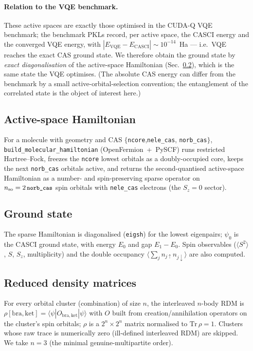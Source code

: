 \documentclass[11pt]{article}
\newcommand{\code}[1]{\texttt{\small #1}}
\begin{document}
\paragraph{Relation to the VQE benchmark.}
These active spaces are exactly those optimised in the CUDA-Q VQE benchmark; the
benchmark PKLs record, per active space, the CASCI energy and the converged VQE
energy, with $|E_{\mathrm{VQE}}-E_{\mathrm{CASCI}}|\sim10^{-14}$~Ha --- i.e.\ VQE
reaches the exact CAS ground state. We therefore obtain the ground state by
\emph{exact diagonalisation} of the active-space Hamiltonian (Sec.~\ref{sec:gs}),
which is the same state the VQE optimises. (The absolute CAS energy can differ
from the benchmark by a small active-orbital-selection convention; the
entanglement of the correlated state is the object of interest here.)

\subsection{Active-space Hamiltonian}
For a molecule with geometry and CAS $\{$\code{ncore},\code{nele\_cas},
\code{norb\_cas}$\}$, \code{build\_molecular\_hamiltonian} (OpenFermion~+~PySCF)
runs restricted Hartree--Fock, freezes the \code{ncore} lowest orbitals as a
doubly-occupied core, keeps the next \code{norb\_cas} orbitals active, and
returns the second-quantised active-space Hamiltonian as a number- and
spin-preserving sparse operator on $n_{\mathrm{so}}=2\,\code{norb\_cas}$ spin
orbitals with \code{nele\_cas} electrons (the $S_z=0$ sector).

\subsection{Ground state}\label{sec:gs}
The sparse Hamiltonian is diagonalised (\code{eigsh}) for the lowest eigenpairs;
$\psi_0$ is the CASCI ground state, with energy $E_0$ and gap $E_1-E_0$. Spin
observables ($\langle S^2\rangle$, $S$, $S_z$, multiplicity) and the double
occupancy $\langle\sum_j n_{j\uparrow}n_{j\downarrow}\rangle$ are also computed.

\subsection{Reduced density matrices}
For every orbital cluster (combination) of size $n$, the interleaved $n$-body RDM
is $\rho[\mathrm{bra},\mathrm{ket}]=\langle\psi|O_{\mathrm{bra,ket}}|\psi\rangle$
with $O$ built from creation/annihilation operators on the cluster's spin
orbitals; $\rho$ is a $2^n\times2^n$ matrix normalised to $\mathrm{Tr}\,\rho=1$.
Clusters whose raw trace is numerically zero (ill-defined interleaved RDM) are
skipped. We take $n=3$ (the minimal genuine-multipartite order).
\end{document}
